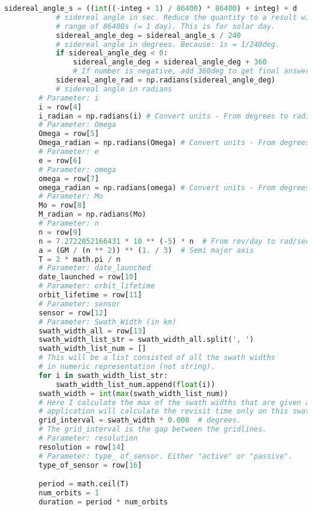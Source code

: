 \documentclass[12pt,a4paper,notitlepage,oneside,openright]{report}
\begin{document}
\begin{center}
\begin{lstlisting}[language=Python, formfeed=\newpage, extendedchars=true]
            sidereal_angle_s = ((int((-integ + 1) / 86400) * 86400) + integ) + d
            # sidereal angle in sec. Reduce the quantity to a result within the
            # range of 86400s (= 1 day). This is for solar day.
            sidereal_angle_deg = sidereal_angle_s / 240
            # sidereal angle in degrees. Because: 1s = 1/240deg.
            if sidereal_angle_deg < 0:
                sidereal_angle_deg = sidereal_angle_deg + 360
                # If number is negative, add 360deg to get final answer
            sidereal_angle_rad = np.radians(sidereal_angle_deg)
            # sidereal angle in radians
        # Parameter: i
        i = row[4]
        i_radian = np.radians(i) # Convert units - From degrees to radians.
        # Parameter: Omega
        Omega = row[5]
        Omega_radian = np.radians(Omega) # Convert units - From degrees to radians.
        # Parameter: e
        e = row[6]
        # Parameter: omega
        omega = row[7]
        omega_radian = np.radians(omega) # Convert units - From degrees to radians.
        # Parameter: Mo
        Mo = row[8]
        M_radian = np.radians(Mo)
        # Parameter: n
        n = row[9]
        n = 7.2722052166431 * 10 ** (-5) * n  # From rev/day to rad/sec
        a = (GM / (n ** 2)) ** (1. / 3)  # Semi major axis
        T = 2 * math.pi / n
        # Parameter: date_launched
        date_launched = row[10]
        # Parameter: orbit_lifetime
        orbit_lifetime = row[11]
        # Parameter: sensor
        sensor = row[12]
        # Parameter: Swath_Width (in km)
        swath_width_all = row[13]
        swath_width_list_str = swath_width_all.split(', ')
        swath_width_list_num = []
        # This will be a list consisted of all the swath widths
        # in numeric representation (not string).
        for i in swath_width_list_str:
            swath_width_list_num.append(float(i))
        swath_width = int(max(swath_width_list_num))
        # Here I calculate the max of the swath widths that are given and the
        # application will calculate the revisit time only on this swath width.
        grid_interval = swath_width * 0.008  # degrees.
        # The grid_interval is the gap between the gridlines.
        # Parameter: resolution
        resolution = row[14]
        # Parameter: type_ of_sensor. Either "active" or "passive".
        type_of_sensor = row[16]

        period = math.ceil(T)
        num_orbits = 1
        duration = period * num_orbits

\end{lstlisting}
\end{center}
\end{document}
